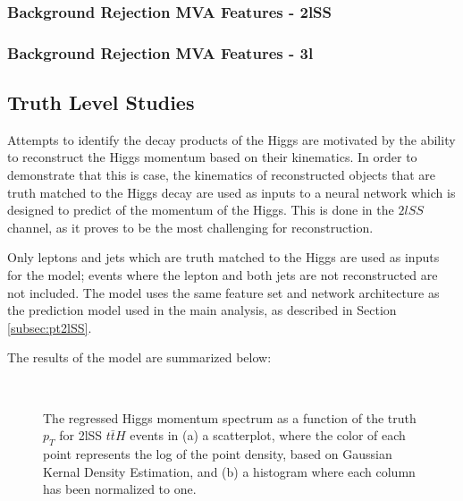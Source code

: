 \subsubsection{Background Rejection MVA Features - 2lSS}
\label{apx:sigBkg2lSS}


\subsubsection{Background Rejection MVA Features - 3l}
\label{apx:sigBkg3l}



\subsection{Truth Level Studies}
\label{sec:truthPtStudies}
  
Attempts to identify the decay products of the Higgs are motivated by the ability to reconstruct the Higgs momentum based on their kinematics. In order to demonstrate that this is case, the kinematics of reconstructed objects that are truth matched to the Higgs decay are used as inputs to a neural network which is designed to predict of the momentum of the Higgs. This is done in the $2lSS$ channel, as it proves to be the most challenging for \pt reconstruction. 

Only leptons and jets which are truth matched to the Higgs are used as inputs for the model; events where the lepton and both jets are not reconstructed are not included. The model uses the same feature set and network architecture as the \pt prediction model used in the main analysis, as described in Section \ref{subsec:pt2lSS}.

The results of the model are summarized below:

\begin{figure}[H]
    \\
    \caption{The regressed Higgs momentum spectrum as a function of the truth $p_T$ for 2lSS $t\bar{t}H$ events in (a) a scatterplot, where the color of each point represents the log of the point density, based on Gaussian Kernal Density Estimation, and (b) a histogram where each column  has been normalized to one.}
    \label{fig:truth2lSSresults}
\end{figure}

